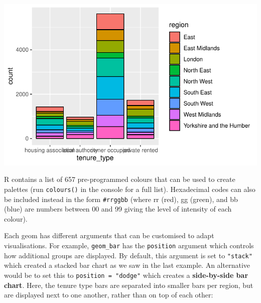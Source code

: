 \documentclass[
  letterpaper,
  DIV=11,
  numbers=noendperiod]{scrreprt}
\begin{document}
\includegraphics{visualisation_files/figure-pdf/stacked bar chart tenure-1.pdf}

\begin{tcolorbox}[enhanced jigsaw, bottomrule=.15mm, left=2mm, leftrule=.75mm, bottomtitle=1mm, coltitle=black, colbacktitle=quarto-callout-tip-color!10!white, toptitle=1mm, arc=.35mm, breakable, title=\textcolor{quarto-callout-tip-color}{\faLightbulb}\hspace{0.5em}{Style tip}, rightrule=.15mm, toprule=.15mm, opacityback=0, opacitybacktitle=0.6, titlerule=0mm, colback=white, colframe=quarto-callout-tip-color-frame]

R contains a list of 657 pre-programmed colours that can be used to
create palettes (run \texttt{colours()} in the console for a full list).
Hexadecimal codes can also be included instead in the form
\texttt{\#rrggbb} (where rr (red), gg (green), and bb (blue) are numbers
between 00 and 99 giving the level of intensity of each colour).

\end{tcolorbox}

Each geom has different arguments that can be customised to adapt
visualisations. For example, \texttt{geom\_bar} has the
\texttt{position} argument which controls how additional groups are
displayed. By default, this argument is set to \texttt{"stack"} which
created a stacked bar chart as we saw in the last example. An
alternative would be to set this to \texttt{position\ =\ "dodge"} which
creates a \textbf{side-by-side bar chart}. Here, the tenure type bars
are separated into smaller bars per region, but are displayed next to
one another, rather than on top of each other:
\end{document}
